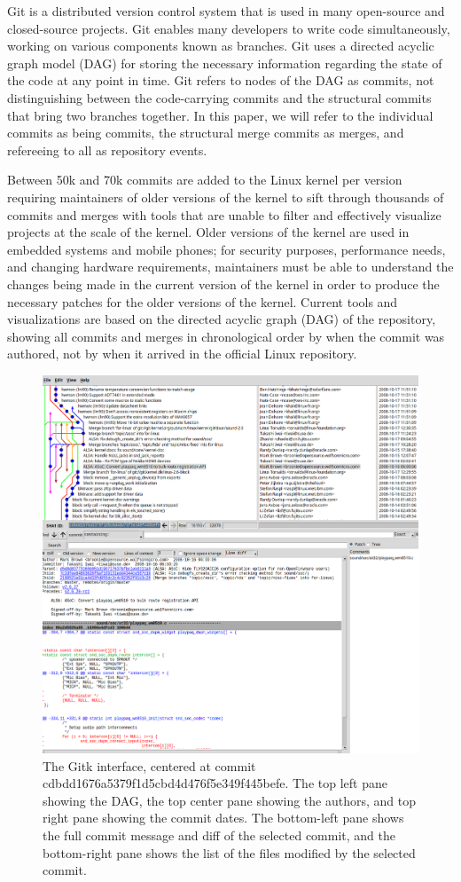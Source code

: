 
Git is a distributed version control system that is used in many
open-source and closed-source projects. Git enables many developers to
write code simultaneously, working on various components known as
branches. Git uses a directed acyclic graph model (DAG) for storing the
necessary information regarding the state of the code at any point in
time. Git refers to nodes of the DAG as commits, not distinguishing
between the code-carrying commits and the structural commits that bring
two branches together. In this paper, we will refer to the individual
commits as being commits, the structural merge commits as merges, and
refereeing to all as repository events.

Between 50k and 70k commits are added to the Linux kernel per version
requiring maintainers of older versions of the kernel to sift through
thousands of commits and merges with tools that are unable to filter and
effectively visualize projects at the scale of the kernel. Older
versions of the kernel are used in embedded systems and mobile phones;
for security purposes, performance needs, and changing hardware
requirements, maintainers must be able to understand the changes being
made in the current version of the kernel in order to produce the
necessary patches for the older versions of the kernel. Current tools
and visualizations are based on the directed acyclic graph (DAG) of the
repository, showing all commits and merges in chronological order by
when the commit was authored, not by when it arrived in the official
Linux repository.

\begin{figure}
  \centering
  \includegraphics[width=0.8\linewidth]{figures/gitk.png}
  \caption{
    The Gitk interface, centered at commit
    cdbdd1676a5379f1d5cbd4d476f5e349f445befe. The top left pane showing
    the DAG, the top center pane showing the authors, and top right pane
    showing the commit dates. The bottom-left pane shows the full
    commit message and diff of the selected commit, and the bottom-right
    pane shows the list of the files modified by the selected commit.
  }
  \label{fig:gitk}
\end{figure}

